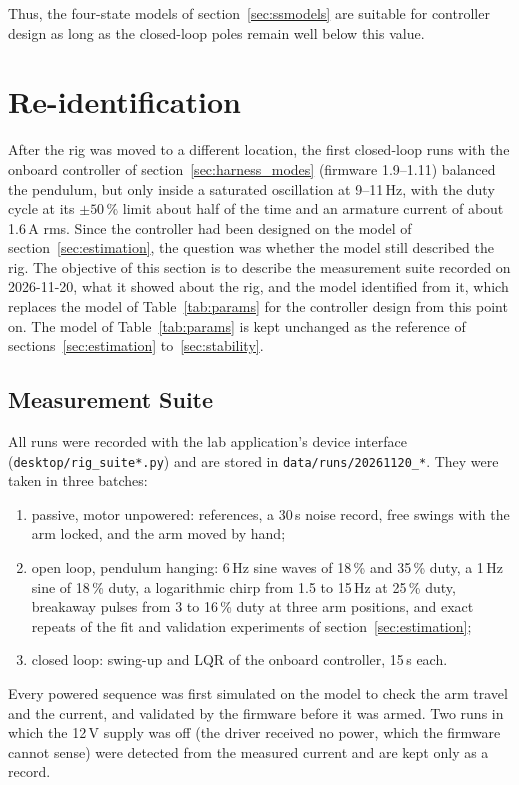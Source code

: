 \documentclass[a4paper,11pt]{article}
\begin{document}
Thus, the four-state models of section~\ref{sec:ssmodels} are suitable for controller design as long as the closed-loop poles remain well below this value.

\section{Re-identification}
\label{sec:reid}
After the rig was moved to a different location, the first closed-loop runs with the onboard controller of section~\ref{sec:harness_modes} (firmware 1.9--1.11) balanced the pendulum, but only inside a saturated oscillation at 9--11\,Hz, with the duty cycle at its $\pm 50\,\%$ limit about half of the time and an armature current of about 1.6\,A rms. Since the controller had been designed on the model of section~\ref{sec:estimation}, the question was whether the model still described the rig. The objective of this section is to describe the measurement suite recorded on 2026-11-20, what it showed about the rig, and the model identified from it, which replaces the model of Table~\ref{tab:params} for the controller design from this point on. The model of Table~\ref{tab:params} is kept unchanged as the reference of sections~\ref{sec:estimation} to~\ref{sec:stability}.

\subsection{Measurement Suite}
\label{sec:reid_suite}
All runs were recorded with the lab application's device interface (\nolinkurl{desktop/rig_suite*.py}) and are stored in \nolinkurl{data/runs/20261120_*}. They were taken in three batches:
\begin{enumerate}
  \item passive, motor unpowered: references, a 30\,s noise record, free swings with the arm locked, and the arm moved by hand;
  \item open loop, pendulum hanging: 6\,Hz sine waves of 18\,\% and 35\,\% duty, a 1\,Hz sine of 18\,\% duty, a logarithmic chirp from 1.5 to 15\,Hz at 25\,\% duty, breakaway pulses from 3 to 16\,\% duty at three arm positions, and exact repeats of the fit and validation experiments of section~\ref{sec:estimation};
  \item closed loop: swing-up and LQR of the onboard controller, 15\,s each.
\end{enumerate}
Every powered sequence was first simulated on the model to check the arm travel and the current, and validated by the firmware before it was armed. Two runs in which the 12\,V supply was off (the driver received no power, which the firmware cannot sense) were detected from the measured current and are kept only as a record.
\end{document}
